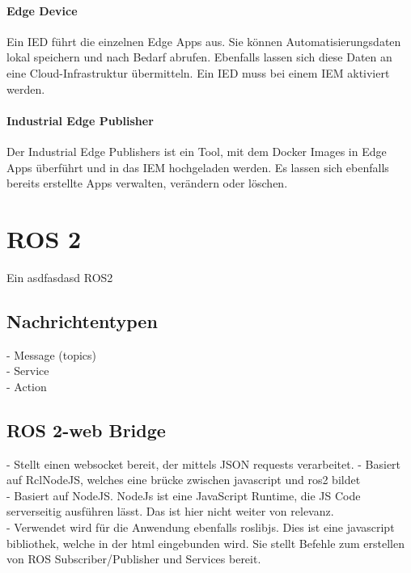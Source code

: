 		\paragraph{Edge Device}
			Ein \gls{IED} führt die einzelnen Edge Apps aus. Sie können Automatisierungsdaten lokal speichern und nach Bedarf abrufen. 
			Ebenfalls lassen sich diese Daten an eine Cloud-Infrastruktur übermitteln. Ein \gls{IED} muss bei einem \gls{IEM} aktiviert werden.
			\cite{siemensIEM_gettingStarted}
			
		\paragraph{Industrial Edge Publisher}
			Der Industrial Edge Publishers ist ein Tool, mit dem Docker Images in Edge Apps überführt und in das \gls{IEM} hochgeladen werden.
			Es lassen sich ebenfalls bereits erstellte Apps verwalten, verändern oder löschen.
			\cite{siemensIE_App}

	
	\section{ROS 2}
	\label{Grundlagen:ROS2}
		Ein asdfasdasd
		\cite{ros2Basic}
		\gls{ROS2}
	
	
	
		\subsection{Nachrichtentypen}
		\label{Grundlagen:ROS2:Nachrichtentypen}
			- Message (topics)\\
			- Service\\
			- Action
			
		\subsection{ROS 2-web Bridge}
		\label{Grundlagen:ROS2:2WebBridge}
			- Stellt einen websocket bereit, der mittels JSON requests verarbeitet. 
			- Basiert auf RclNodeJS, welches eine brücke zwischen javascript und ros2 bildet\\
			- Basiert auf NodeJS. NodeJs ist eine JavaScript Runtime, die JS Code serverseitig ausführen lässt.
			Das ist hier nicht weiter von relevanz.\\
			- Verwendet wird für die Anwendung ebenfalls roslibjs. Dies ist eine javascript bibliothek, welche in der html eingebunden wird. Sie stellt Befehle zum erstellen von ROS Subscriber/Publisher und Services bereit.\\
			
